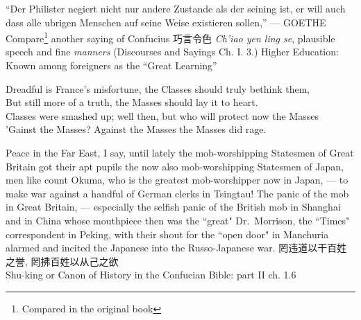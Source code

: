 \begin{thebibliography}{30}
     ``Der Philister negiert nicht nur andere Zustande als der seining ist, er will auch dass alle ubrigen Menschen auf seine Weise existieren sollen,'' --- GOETHE
     Compare\footnote{Compared in the original book} another saying of Confucius 巧言令色 \emph{Ch'iao yen ling se}, plausible speech and fine \emph{manners} (Discourses and Sayings Ch. I. 3.)
     Higher Education: Known among foreigners as the ``Great Learning''
     \begin{center}
    Dreadful is France's misfortune, the Classes should truly bethink them, \\
    But still more of a truth, the Masses should lay it to heart.\\
    Classes were smashed up; well then, but who will protect now the Masses\\
    'Gainst the Masses? Against the Masses the Masses did rage. \\
\end{center}
     Peace in the Far East, I say, until lately the mob-worshipping Statesmen of Great Britain got their apt pupils the now also mob-worshipping Statesmen of Japan, men like count Okuma, who is the greatest mob-worshipper now in Japan, --- to make war against a handful of German clerks in Tsingtau!
     The panic of the mob in Great Britain, --- especially the selfish panic of the British mob in Shanghai and in China whose mouthpiece then was the ``great" Dr.~Morrison, the ``Times" correspondent in Peking, with their shout for the ``open door" in Manchuria alarmed and incited the Japanese into the Russo-Japanese war.
     罔违道以干百姓之誉, 罔拂百姓以从己之欲 \\ Shu-king or Canon of History in the Confucian Bible: part II ch. 1.6
\end{thebibliography}
